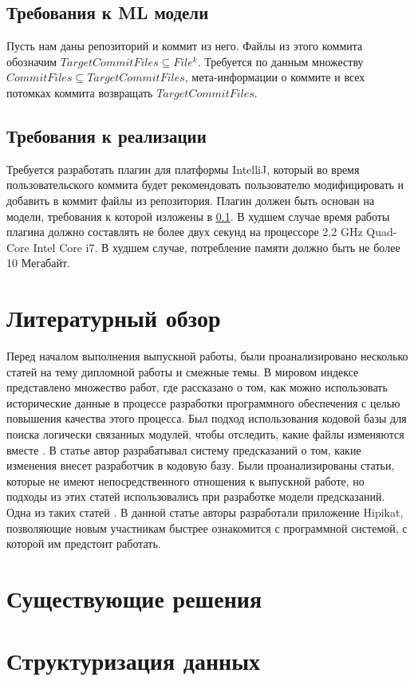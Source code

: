 \documentclass[times]{itmo-student-thesis}
\begin{document}
\subsection{Требования к ML модели}\label{ml-model-req}
Пусть нам даны репозиторий и коммит из него. Файлы из этого коммита обозначим $TargetCommitFiles \subseteq File^k$. Требуется по данным множеству $CommitFiles \subseteq TargetCommitFiles$, мета-информации о коммите и всех потомках коммита возвращать $TargetCommitFiles$.
\subsection{Требования к реализации}
Требуется разработать плагин для платформы IntelliJ, который во время пользовательского коммита будет рекомендовать пользователю модифицировать и добавить в коммит файлы из репозитория. Плагин должен быть основан на модели, требования к которой изложены в \ref{ml-model-req}. В худшем случае время работы плагина должно составлять не более двух секунд на процессоре 2,2 GHz Quad-Core Intel Core i7. В худшем случае, потребление памяти должно быть не более 10 Мегабайт.
\section{Литературный обзор}
Перед началом выполнения выпускной работы, были проанализировано несколько статей на тему дипломной работы и смежные темы. В мировом индексе представлено множество работ, где рассказано о том, как можно использовать исторические данные в процессе разработки программного обеспечения с целью повышения качества этого процесса. Был подход использования кодовой базы для поиска логически связанных модулей, чтобы отследить, какие файлы изменяются вместе \cite{logical-modules}. В статье \cite{source-change} автор разрабатывал систему предсказаний о том, какие изменения внесет разработчик в кодовую базу. Были проанализированы статьи, которые не имеют непосредственного отношения к выпускной работе, но подходы из этих статей использовались при разработке модели предсказаний. Одна из таких статей \cite{project-memory}. В данной статье авторы разработали приложение Hipikat, позволяющие новым участникам быстрее ознакомится с программной системой, с которой им предстоит работать.
\section{Существующие решения}
\section{Структуризация данных}
\end{document}
